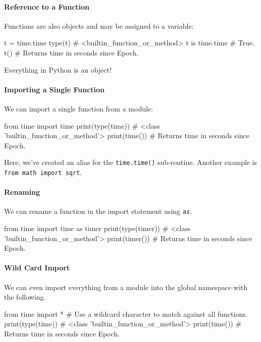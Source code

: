 \documentclass[12pt,letterpaper,twoside]{article}
\begin{document}
\begin{enumerate}
\paragraph{Reference to a Function}
Functions are also objects and may be assigned to a variable:

\begin{python}
t = time.time
type(t)          # <builtin_function_or_method>
t is time.time   # True.
t()              # Returns time in seconds since Epoch.
\end{python}

Everything in Python is an object!

\paragraph{Importing a Single Function}
We can import a single function from a module:

\begin{python}
from time import time
print(type(time))   # <class 'builtin_function_or_method'>
print(time())       # Returns time in seconds since Epoch.
\end{python}

Here, we've created an alias for the \texttt{time.time()} sub-routine. 
Another example is \texttt{from\ math\ import\ sqrt}.

\paragraph{Renaming}
We can rename a function in the import statement using \texttt{as}.

\begin{python}
from time import time as timer
print(type(timer))   # <class 'builtin_function_or_method'>
print(timer())       # Returns time in seconds since Epoch.
\end{python}

\paragraph{Wild Card Import}
We can even import everything from a module into the global namespace with the following.

\begin{python}
from time import *    # Use a wildcard character to match against all functions.
print(type(time))     # <class 'builtin_function_or_method'>
print(time())         # Returns time in seconds since Epoch.
\end{python}


\end{enumerate}
\end{document}
